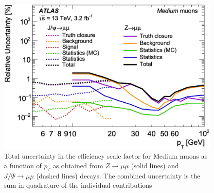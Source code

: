 \begin{figure}[!htbp]
  \centering
  \includegraphics[width=0.8\linewidth]{figures/objects/medium_muons}
  \caption{\cite{Aad:2016jkr} Total uncertainty in the efficiency scale factor for Medium muons as a function of $p_{T}$ as obtained from $Z \rightarrow \mu\mu$ (solid lines) and $J/\Psi \rightarrow \mu\mu$ (dashed lines) decays. The combined uncertainty is the sum in quadrature of the individual contributions}
  \label{sec:objects:medium_muons}
\end{figure}
